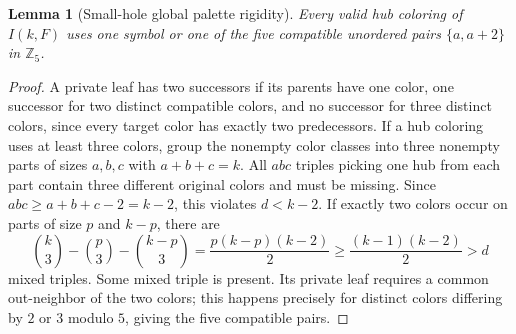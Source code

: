 \documentclass[11pt]{article}
\newtheorem{lemma}{Lemma}
\begin{document}
\begin{lemma}[Small-hole global palette rigidity]
Every valid hub coloring of $I(k,F)$ uses one symbol or
one of the five compatible unordered pairs
$\{a,a+2\}$ in $\mathbb Z_5$.
\end{lemma}
\begin{proof}
A private leaf has two successors if its parents have one
color, one successor for two distinct compatible colors,
and no successor for three distinct colors, since every
target color has exactly two predecessors.
If a hub coloring uses at least three colors, group the
nonempty color classes into three nonempty parts of sizes
$a,b,c$ with $a+b+c=k$. All $abc$ triples picking one
hub from each part contain three different original colors
and must be missing. Since $abc\ge a+b+c-2=k-2$,
this violates $d<k-2$.
If exactly two colors occur on parts of size $p$ and $k-p$,
there are
\[
 \binom{k}{3}-\binom p3-\binom{k-p}3
 =\frac{p(k-p)(k-2)}2
 \ge\frac{(k-1)(k-2)}2>d
\]
mixed triples. Some mixed triple is present. Its private
leaf requires a common out-neighbor of the two colors;
this happens precisely for distinct colors differing by
$2$ or $3$ modulo $5$, giving the five compatible pairs.
\end{proof}
\end{document}
